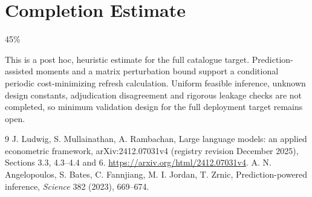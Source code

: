 \documentclass[11pt]{article}
\theoremstyle{definition}
\begin{document}
\section{Completion Estimate}
45\%

This is a post hoc, heuristic estimate for the full catalogue target.
Prediction-assisted moments and a matrix perturbation bound support a conditional periodic cost-minimizing refresh calculation. Uniform feasible inference, unknown design constants, adjudication disagreement and rigorous leakage checks are not completed, so minimum validation design for the full deployment target remains open.

\begin{thebibliography}{9}
 J. Ludwig, S. Mullainathan, A. Rambachan, Large language models: an applied econometric framework, arXiv:2412.07031v4 (registry revision December 2025), Sections 3.3, 4.3--4.4 and 6. \url{https://arxiv.org/html/2412.07031v4}.
 A. N. Angelopoulos, S. Bates, C. Fannjiang, M. I. Jordan, T. Zrnic, Prediction-powered inference, \emph{Science} 382 (2023), 669--674.
\end{thebibliography}
\end{document}
